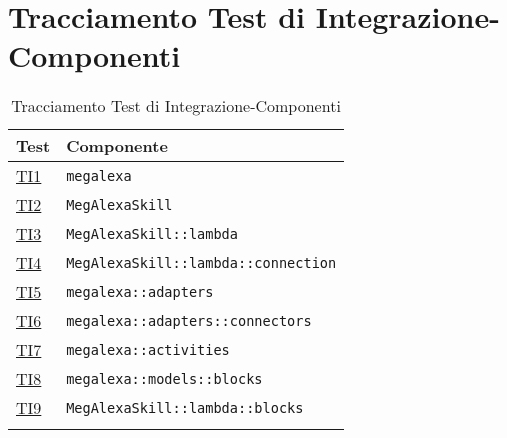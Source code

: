\section{Tracciamento Test di Integrazione-Componenti}
\normalsize
\begin{longtable}{|>{\centering}m{3cm}|m{9cm}<{\centering}|}
\hline
\textbf{Test} & \textbf{Componente}\\
\hline
\endhead
\hyperlink{TI1}{TI1} & \texttt{megalexa}\\ \hline
\hyperlink{TI2}{TI2} & \texttt{MegAlexaSkill}\\ \hline
\hyperlink{TI3}{TI3} & \texttt{MegAlexaSkill::lambda}\\ \hline
\hyperlink{TI4}{TI4} & \texttt{MegAlexaSkill::lambda::connection}\\ \hline
\hyperlink{TI5}{TI5} & \texttt{megalexa::adapters}\\ \hline
\hyperlink{TI6}{TI6} & \texttt{megalexa::adapters::connectors}\\ \hline
\hyperlink{TI7}{TI7} & \texttt{megalexa::activities}\\ \hline
\hyperlink{TI8}{TI8} & \texttt{megalexa::models::blocks}\\ \hline
\hyperlink{TI9}{TI9} & \texttt{MegAlexaSkill::lambda::blocks}\\ \hline
\caption[Tracciamento Test di Integrazione-Componenti]{Tracciamento Test di Integrazione-Componenti}
\label{tabella:ts-requi}
\end{longtable}
\clearpage


